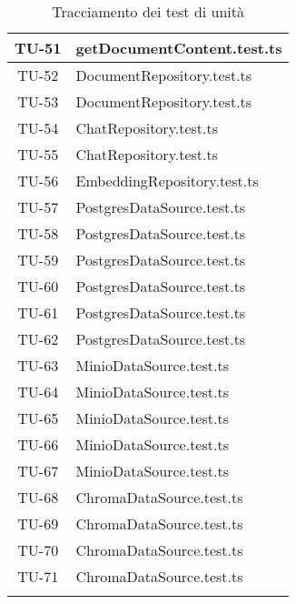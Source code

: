 \begin{xltabular}{0.7\textwidth}{| c | X |}
    \hline
    TU-51 & getDocumentContent.test.ts \\
    \hline
    TU-52 & DocumentRepository.test.ts \\
    \hline
    TU-53 & DocumentRepository.test.ts \\
    \hline
    TU-54 & ChatRepository.test.ts \\
    \hline
    TU-55 & ChatRepository.test.ts \\
    \hline
    TU-56 & EmbeddingRepository.test.ts \\
    \hline
    TU-57 & PostgresDataSource.test.ts \\
    \hline
    TU-58 & PostgresDataSource.test.ts \\
    \hline
    TU-59 & PostgresDataSource.test.ts \\
    \hline
    TU-60 & PostgresDataSource.test.ts \\
    \hline
    TU-61 & PostgresDataSource.test.ts \\
    \hline
    TU-62 & PostgresDataSource.test.ts \\
    \hline
    TU-63 & MinioDataSource.test.ts \\
    \hline
    TU-64 & MinioDataSource.test.ts \\
    \hline
    TU-65 & MinioDataSource.test.ts \\
    \hline
    TU-66 & MinioDataSource.test.ts \\
    \hline
    TU-67 & MinioDataSource.test.ts \\
    \hline
    TU-68 & ChromaDataSource.test.ts \\
    \hline
    TU-69 & ChromaDataSource.test.ts \\
    \hline
    TU-70 & ChromaDataSource.test.ts \\
    \hline
    TU-71 & ChromaDataSource.test.ts \\
    \hline
     \caption{Tracciamento dei test di unità}
    \label{tab:tracctestunita}
\end{xltabular}
